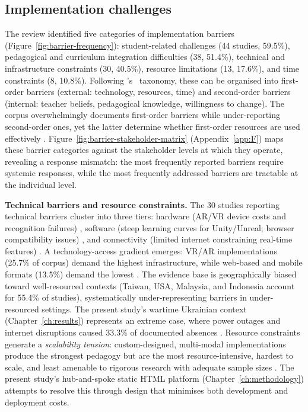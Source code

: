\subsection{Implementation challenges} \label{sec:implementation-challenges}

The review identified five categories of implementation barriers (Figure~\ref{fig:barrier-frequency}): student-related challenges (44 studies, 59.5\%), pedagogical and curriculum integration difficulties (38, 51.4\%), technical and infrastructure constraints (30, 40.5\%), resource limitations (13, 17.6\%), and time constraints (8, 10.8\%). Following \citeauthor{Ertmer1999}'s~\cite{Ertmer1999} taxonomy, these can be organised into first-order barriers (external: technology, resources, time) and second-order barriers (internal: teacher beliefs, pedagogical knowledge, willingness to change). The corpus overwhelmingly documents first-order barriers while under-reporting second-order ones, yet the latter determine whether first-order resources are used effectively \cite{KorniienkoSemerikov2024}. Figure~\ref{fig:barrier-stakeholder-matrix} (Appendix~\ref{app:F}) maps these barrier categories against the stakeholder levels at which they operate, revealing a response mismatch: the most frequently reported barriers require systemic responses, while the most frequently addressed barriers are tractable at the individual level.



\textbf{Technical barriers and resource constraints.} The 30 studies reporting technical barriers cluster into three tiers: hardware (AR/VR device costs and recognition failures) \cite{1Barbatsis201159, 49Huizenga2007127, 6Czerwinski2018, 73Wolfartsberger2011160}, software (steep learning curves for Unity/Unreal; browser compatibility issues) \cite{63Liu2021, 14Forsyth2023}, and connectivity (limited internet constraining real-time features) \cite{77Ramansyah2021, 22Nugroho2020149}. A technology-access gradient emerges: VR/AR implementations (25.7\% of corpus) demand the highest infrastructure, while web-based and mobile formats (13.5\%) demand the lowest \cite{58Shih2015173, 48Moketar2021}. The evidence base is geographically biased toward well-resourced contexts (Taiwan, USA, Malaysia, and Indonesia account for 55.4\% of studies), systematically under-representing barriers in under-resourced settings. The present study's wartime Ukrainian context (Chapter~\ref{ch:results}) represents an extreme case, where power outages and internet disruptions caused 33.3\% of documented absences \cite{KorniienkoSemerikov2024}. Resource constraints generate a \textit{scalability tension}: custom-designed, multi-modal implementations produce the strongest pedagogy but are the most resource-intensive, hardest to scale, and least amenable to rigorous research with adequate sample sizes \cite{50Lye2013, 9Lin2018, Gasca-Hurtado2016}. The present study's hub-and-spoke static HTML platform (Chapter~\ref{ch:methodology}) attempts to resolve this through design that minimises both development and deployment costs.

